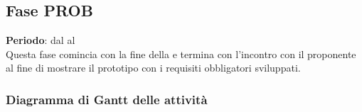 \subsection{Fase PROB}
	\textbf{Periodo}: dal  al  \\Questa fase comincia con la fine della  e termina con l'incontro con il proponente al fine di mostrare il prototipo con i requisiti obbligatori sviluppati. 
	\subsubsection{Diagramma di Gantt delle attività}
